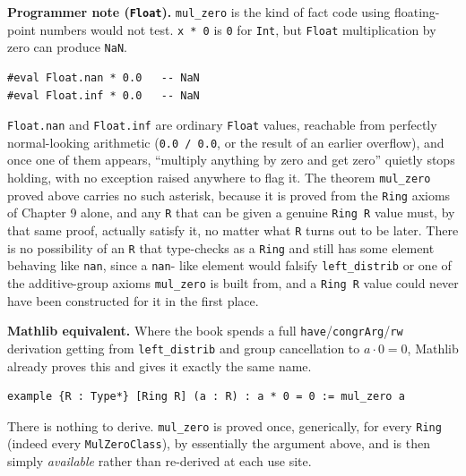 \textbf{Programmer note (\texttt{Float}).} \texttt{mul\_\allowbreak{}zero} is the kind of fact code using floating-point numbers would not test. \texttt{x * 0} is \texttt{0} for \texttt{Int}, but \texttt{Float} multiplication by zero can produce \texttt{NaN}.

\begin{lstlisting}
#eval Float.nan * 0.0   -- NaN
#eval Float.inf * 0.0   -- NaN
\end{lstlisting}

\texttt{Float.nan} and \texttt{Float.inf} are ordinary \texttt{Float} values, reachable from perfectly normal-looking arithmetic (\texttt{0.0 /\allowbreak{} 0.0}, or the result of an earlier overflow), and once one of them appears, ``multiply anything by zero and get zero'' quietly stops holding, with no exception raised anywhere to flag it. The theorem \texttt{mul\_\allowbreak{}zero} proved above carries no such asterisk, because it is proved from the \texttt{Ring} axioms of Chapter 9 alone, and any \texttt{R} that can be given a genuine \texttt{Ring R} value must, by that same proof, actually satisfy it, no matter what \texttt{R} turns out to be later. There is no possibility of an \texttt{R} that type-checks as a \texttt{Ring} and still has some element behaving like \texttt{nan}, since a \texttt{nan}- like element would falsify \texttt{left\_\allowbreak{}distrib} or one of the additive-group axioms \texttt{mul\_\allowbreak{}zero} is built from, and a \texttt{Ring R} value could never have been constructed for it in the first place.

\textbf{Mathlib equivalent.} Where the book spends a full \texttt{have}/\texttt{congrArg}/\texttt{rw} derivation getting from \texttt{left\_\allowbreak{}distrib} and group cancellation to \(a\cdot 0=0\), Mathlib already proves this and gives it exactly the same name.

\begin{lstlisting}
example {R : Type*} [Ring R] (a : R) : a * 0 = 0 := mul_zero a
\end{lstlisting}

There is nothing to derive. \texttt{mul\_\allowbreak{}zero} is proved once, generically, for every \texttt{Ring} (indeed every \texttt{MulZeroClass}), by essentially the argument above, and is then simply \emph{available} rather than re-derived at each use site.
